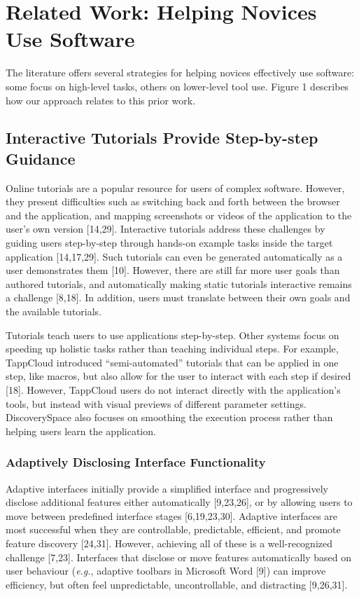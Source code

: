 \section{Related Work: Helping Novices Use Software}
The literature offers several strategies for helping novices effectively use software: some focus on high-level tasks, others on lower-level tool use. Figure 1 describes how our approach relates to this prior work. 

\subsection{Interactive Tutorials Provide Step-by-step Guidance}
Online tutorials are a popular resource for users of complex software. However, they present difficulties such as switching back and forth between the browser and the application, and mapping screenshots or videos of the application to the user's own version [14,29]. Interactive tutorials address these challenges by guiding users step-by-step through hands-on example tasks inside the target application [14,17,29]. Such tutorials can even be generated automatically as a user demonstrates them [10]. However, there are still far more user goals than authored tutorials, and automatically making static tutorials interactive remains a challenge [8,18]. In addition, users must translate between their own goals and the available tutorials.

Tutorials teach users to use applications step-by-step. Other systems focus on speeding up holistic tasks rather than teaching individual steps. For example, TappCloud introduced ``semi-automated'' tutorials that can be applied in one step, like macros, but also allow for the user to interact with each step if desired [18]. However, TappCloud users do not interact directly with the application's tools, but instead with visual previews of different parameter settings. Discovery\-Space also focuses on smoothing the execution process rather than helping users learn the application.

\subsubsection{Adaptively Disclosing Interface Functionality}
Adaptive interfaces initially provide a simplified interface and progressively disclose additional features either automatically [9,23,26], or by allowing users to move between predefined interface stages [6,19,23,30]. Adaptive interfaces are most successful when they are controllable, predictable, efficient, and promote feature discovery [24,31]. However, achieving all of these is a well-recognized challenge [7,23]. Interfaces that disclose or move features automatically based on user behaviour (\textit{e.g.}, adaptive toolbars in Microsoft Word [9]) can improve efficiency, but often feel unpredictable, uncontrollable, and distracting [9,26,31].

